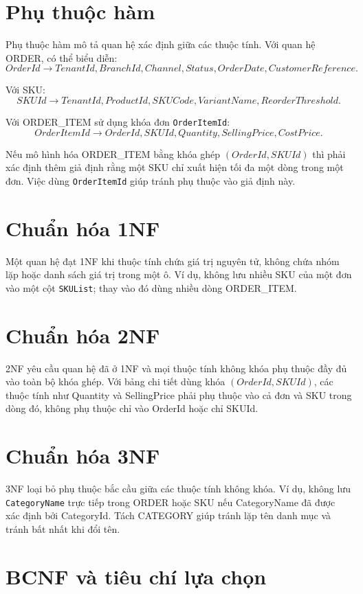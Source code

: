 \section{Phụ thuộc hàm}

Phụ thuộc hàm mô tả quan hệ xác định giữa các thuộc tính. Với quan hệ ORDER, có thể biểu diễn:
\[
OrderId \rightarrow TenantId, BranchId, Channel, Status, OrderDate, CustomerReference.
\]

Với SKU:
\[
SKUId \rightarrow TenantId, ProductId, SKUCode, VariantName, ReorderThreshold.
\]

Với ORDER\_ITEM sử dụng khóa đơn \texttt{OrderItemId}:
\[
OrderItemId \rightarrow OrderId, SKUId, Quantity, SellingPrice, CostPrice.
\]

Nếu mô hình hóa ORDER\_ITEM bằng khóa ghép $(OrderId, SKUId)$ thì phải xác định thêm giả định rằng một SKU chỉ xuất hiện tối đa một dòng trong một đơn. Việc dùng \texttt{OrderItemId} giúp tránh phụ thuộc vào giả định này.

\section{Chuẩn hóa 1NF}

Một quan hệ đạt 1NF khi thuộc tính chứa giá trị nguyên tử, không chứa nhóm lặp hoặc danh sách giá trị trong một ô. Ví dụ, không lưu nhiều SKU của một đơn vào một cột \texttt{SKUList}; thay vào đó dùng nhiều dòng ORDER\_ITEM.

\section{Chuẩn hóa 2NF}

2NF yêu cầu quan hệ đã ở 1NF và mọi thuộc tính không khóa phụ thuộc đầy đủ vào toàn bộ khóa ghép. Với bảng chi tiết dùng khóa $(OrderId, SKUId)$, các thuộc tính như Quantity và SellingPrice phải phụ thuộc vào cả đơn và SKU trong dòng đó, không phụ thuộc chỉ vào OrderId hoặc chỉ SKUId.

\section{Chuẩn hóa 3NF}

3NF loại bỏ phụ thuộc bắc cầu giữa các thuộc tính không khóa. Ví dụ, không lưu \texttt{CategoryName} trực tiếp trong ORDER hoặc SKU nếu CategoryName đã được xác định bởi CategoryId. Tách CATEGORY giúp tránh lặp tên danh mục và tránh bất nhất khi đổi tên.

\section{BCNF và tiêu chí lựa chọn}

